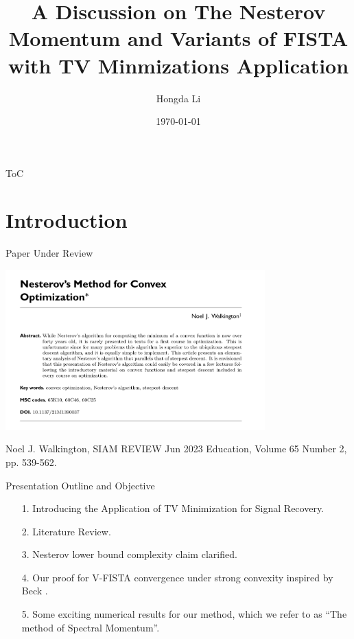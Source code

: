 \documentclass[11pt]{beamer}
\author{Hongda Li}
\title{A Discussion on The Nesterov Momentum and Variants of FISTA with TV Minmizations Application}
\institute[]{UBC Okangan}
\date{\today}
\theoremstyle{definition}
\begin{document}
\begin{frame}
    \titlepage
\end{frame}

\begin{frame}{ToC}
    \tableofcontents
\end{frame}

\section{Introduction}
    \begin{frame}{Paper Under Review}
        \begin{center}
            \includegraphics[width=10cm]{Assets/paper-titlepage.png}    
        \end{center}
        Noel J. Walkington, SIAM REVIEW Jun 2023 Education, Volume 65 Number 2, pp. 539-562. \cite{noel_nesterovs_nodate}
    \end{frame}
    \begin{frame}{Presentation Outline and Objective}
        \begin{itemize}
            \item [1.] Introducing the Application of TV Minimization for Signal Recovery.
            \item [2.] Literature Review. 
            \item [3.] Nesterov lower bound complexity claim clarified. 
            \item [4.] Our proof for V-FISTA convergence under strong convexity inspired by Beck \cite[10.7.7]{beck_first-order_nodate}. 
            \item [5.] Some exciting numerical results for our method, which we refer to as ``The method of Spectral Momentum''. 
        \end{itemize}
    \end{frame}
\end{document}
